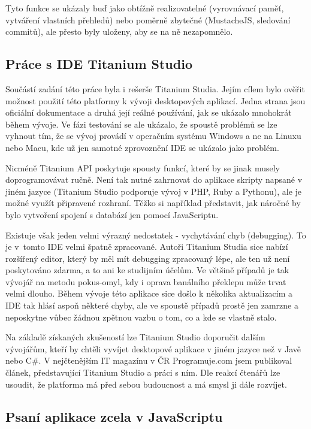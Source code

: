 Tyto funkce se ukázaly buď jako obtížně realizovatelné (vyrovnávací paměť, vytváření vlastních přehledů) nebo poměrně zbytečné (MustacheJS, sledování commitů), ale přesto byly uloženy, aby se na ně nezapomnělo.

\subsection{Práce s IDE Titanium Studio}

Součástí zadání této práce byla i rešerše Titanium Studia. Jejím cílem bylo ověřit možnost použití této platformy k vývoji desktopových aplikací. Jedna strana jsou oficiální dokumentace a druhá její reálné používání, jak se ukázalo mnohokrát během vývoje. Ve fázi testování se ale ukázalo, že spoustě problémů se lze vyhnout tím, že se vývoj provádí v operačním systému Windows a ne na Linuxu nebo Macu, kde už jen samotné zprovoznění IDE se ukázalo jako problém.

Nicméně Titanium API poskytuje spousty funkcí, které by se jinak musely doprogramovávat ručně. Není tak nutné zahrnovat do aplikace skripty napsané v jiném jazyce (Titanium Studio podporuje vývoj v PHP, Ruby a Pythonu), ale je možné využít připravené rozhraní. Těžko si například představit, jak náročné by bylo vytvoření spojení s databází jen pomocí JavaScriptu.

Existuje však jeden velmi výrazný nedostatek - vychytávání chyb (debugging). To je v~tomto IDE velmi špatně zpracované. Autoři Titanium Studia sice nabízí rozšířený editor, který by měl mít debugging zpracovaný lépe, ale ten už není poskytováno zdarma, a to ani ke studijním účelům. Ve většině případů je tak vývojář na metodu pokus-omyl, kdy i oprava banálního překlepu může trvat velmi dlouho. Během vývoje této aplikace sice došlo k několika aktualizacím a IDE tak hlásí aspoň některé chyby, ale ve spoustě případů prostě jen zamrzne a neposkytne vůbec žádnou zpětnou vazbu o tom, co a kde se vlastně stalo.

Na základě získaných zkušeností lze Titanium Studio doporučit dalším vývojářům, kteří by chtěli vyvíjet desktopové aplikace v jiném jazyce než v Javě nebo C\#. V nejčtenějším IT magazínu v ČR Programuje.com jsem publikoval článek\cite{selfpromo}, představující Titanium Studio a práci s ním. Dle reakcí čtenářů lze usoudit, že platforma má před sebou budoucnost a má smysl ji dále rozvíjet.

\subsection{Psaní aplikace zcela v JavaScriptu}

